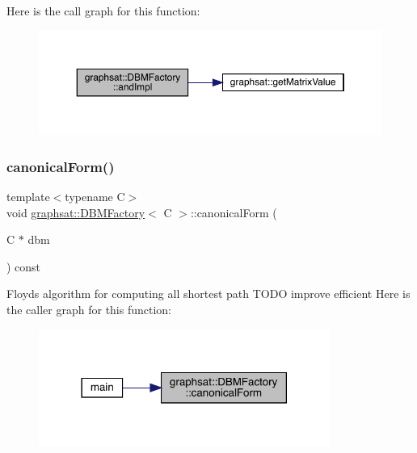 Here is the call graph for this function\+:
\nopagebreak
\begin{figure}[H]
\begin{center}
\leavevmode
\includegraphics[width=350pt]{classgraphsat_1_1_d_b_m_factory_aa0ecf76e4c8f3de3a60ef3642e417dc1_cgraph}
\end{center}
\end{figure}
\mbox{\label{classgraphsat_1_1_d_b_m_factory_ac5b5033506ebb4956d49499e998cd2c5}} 
\subsubsection{\texorpdfstring{canonicalForm()}{canonicalForm()}}
{\footnotesize\ttfamily template$<$typename C$>$ \\
void \mbox{\hyperlink{classgraphsat_1_1_d_b_m_factory}{graphsat\+::\+D\+B\+M\+Factory}}$<$ C $>$\+::canonical\+Form (\begin{DoxyParamCaption}\item[{C $\ast$}]{dbm }\end{DoxyParamCaption}) const\hspace{0.3cm}{\ttfamily [inline]}}

Floyds algorithm for computing all shortest path T\+O\+DO improve efficient Here is the caller graph for this function\+:
\nopagebreak
\begin{figure}[H]
\begin{center}
\leavevmode
\includegraphics[width=270pt]{classgraphsat_1_1_d_b_m_factory_ac5b5033506ebb4956d49499e998cd2c5_icgraph}
\end{center}
\end{figure}
\mbox{\label{classgraphsat_1_1_d_b_m_factory_a9a6781c8ba87d7e1d3514a603a8600f4}} 
